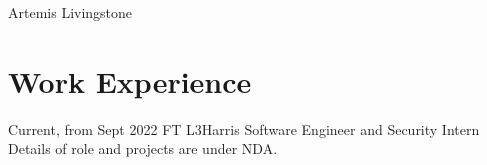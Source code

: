 \documentclass[
	9pt, %
]{FreemanCV}
\begin{document}
\begin{paracol}{2} %


\parbox[][0.08\textheight][c]{\linewidth}{ %
	\centering %
	
	\vspace*{\fill}
	\sffamily\Huge Artemis Livingstone  %
	\vspace*{\fill}
	\vfill
	
}


\section{Work Experience}





\jobentry
	{Current, from Sept 2022} %
	{FT} %
	{L3Harris} %
	{Software Engineer and Security Intern} %
	{Details of role and projects are under NDA.} %



\end{paracol}
\end{document}
